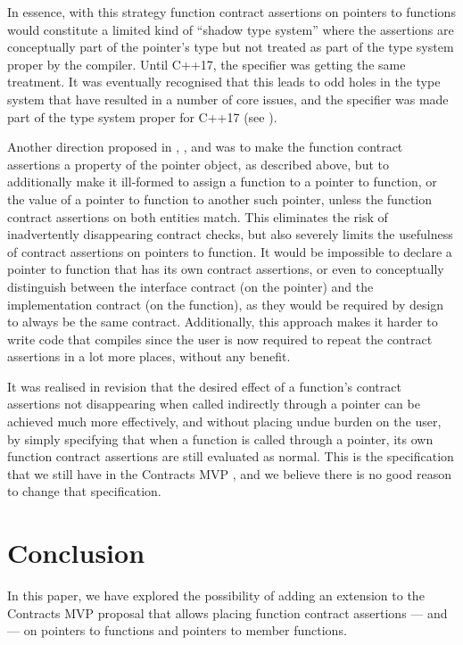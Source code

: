 In essence, with this strategy function contract assertions on pointers to functions would constitute a limited kind of ``shadow type system'' where the assertions are conceptually part of the pointer's type but not treated as part of the type system proper by the compiler. Until C++17, the  specifier was getting the same treatment. It was eventually recognised that this leads to odd holes in the type system that have resulted in a number of core issues, and the  specifier was made part of the type system proper for C++17 (see \cite{P0012R1}).

Another direction proposed in \cite{N4415}, \cite{P0287R0}, and \cite{P0380R0} was to make the function contract assertions a property of the pointer object, as described above, but to additionally make it ill-formed to assign a function to a pointer to function, or the value of a pointer to function to another such pointer, unless the function contract assertions on both entities match. This eliminates the risk of inadvertently disappearing contract checks, but also severely limits the usefulness of contract assertions on pointers to function. It would be impossible to declare a pointer to function that has its own contract assertions, or even to conceptually distinguish between the interface contract (on the pointer) and the implementation contract (on the function), as they would be required by design to always be the same contract. Additionally, this approach makes it harder to write code that compiles since the user is now required to repeat the contract assertions in a lot more places, without any benefit.

It was realised in revision \cite{P0380R1} that the desired effect of a function's contract assertions not disappearing when called indirectly through a pointer can be achieved much more effectively, and without placing undue burden on the user, by simply specifying that when a function is called through a pointer, its own function contract assertions are still evaluated as normal. This is the specification that we still have in the Contracts MVP \cite{P2900R7}, and we believe there is no good reason to change that specification.

\section{Conclusion}

In this paper, we have explored the possibility of adding an extension to the Contracts MVP proposal \cite{P2900R7} that allows placing function contract assertions ---  and  --- on pointers to functions and pointers to member functions.

